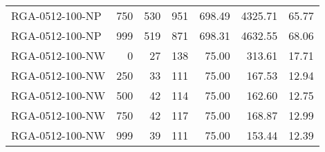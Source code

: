 \begin{table}[htbp]
{\begin{tabular}{lrrrrrr}
    RGA-0512-100-NP & 750    & 530    & 951    & 698.49 & 4325.71 & 65.77 \\
    RGA-0512-100-NP & 999    & 519    & 871    & 698.31 & 4632.55 & 68.06 \\ \hline
    RGA-0512-100-NW & 0      & 27     & 138    & 75.00  & 313.61 & 17.71 \\
    RGA-0512-100-NW & 250    & 33     & 111    & 75.00  & 167.53 & 12.94 \\
    RGA-0512-100-NW & 500    & 42     & 114    & 75.00  & 162.60 & 12.75 \\
    RGA-0512-100-NW & 750    & 42     & 117    & 75.00  & 168.87 & 12.99 \\
    RGA-0512-100-NW & 999    & 39     & 111    & 75.00  & 153.44 & 12.39 \\
    \bottomrule
    \end{tabular}}
  \label{tab:addlabel}%
\end{table}%
